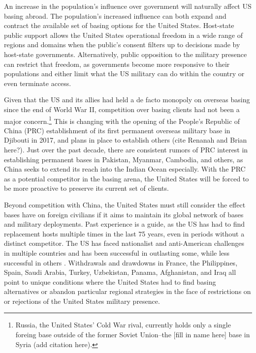 {An increase in the population's influence over government will naturally affect US basing abroad. The population's increased influence can both expand and contract the available set of basing options for the United States. Host-state public support allows the United States operational freedom in a wide range of regions and domains when the public's consent filters up to decisions made by host-state governments. Alternatively, public opposition to the military presence can restrict that freedom, as governments become more responsive to their populations and either limit what the US military can do within the country or even terminate access. 

Given that the US and its allies had held a de facto monopoly on overseas basing since the end of World War II, competition over basing clients had not been a major concern.\footnote{Russia, the United States' Cold War rival, currently holds only a single foreing base outside of the former Soviet Union--the [fill in name here] base in Syria (add citation here).} This is changing with the opening of the People's Republic of China (PRC) establishment of its first permanent overseas military base in Djibouti in 2017, and plans in place to establish others (cite Renanah and Brian here?). Just over the past decade, there are consistent rumors of PRC interest in establishing permanent bases in Pakistan, Myanmar, Cambodia, and others, as China seeks to extend its reach into the Indian Ocean especially. With the PRC as a potential competitor in the basing arena, the United States will be forced to be more proactive to preserve its current set of clients. 

Beyond competition with China, the United States must still consider the effect bases have on foreign civilians if it aims to maintain its global network of bases and military deployments. Past experience is a guide, as the US has had to find replacement hosts multiple times in the last 75 years, even in periods without a distinct competitor. The US has faced nationalist and anti-American challenges in multiple countries and has been successful in outlasting some, while less successful in others \cite{blaker1990,Baker2004}. Withdrawals and drawdowns in France, the Philippines, Spain, Saudi Arabia, Turkey, Uzbekistan, Panama, Afghanistan, and Iraq all point to unique conditions where the United States had to find basing alternatives or abandon particular regional strategies in the face of restrictions on or rejections of the United States military presence. 
	
}
